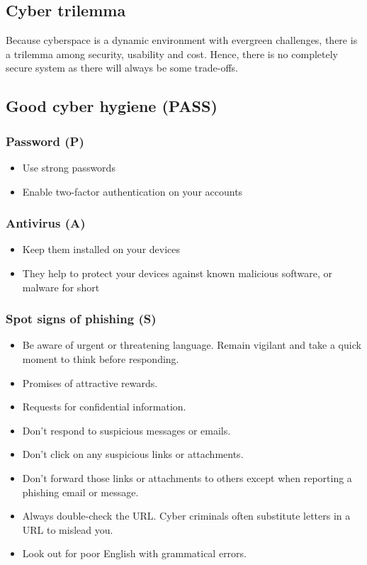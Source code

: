 \documentclass[11pt]{article}
\begin{document}
\subsection{Cyber trilemma}
\label{sec:org4428675}
Because cyberspace is a dynamic environment with evergreen challenges, there is a trilemma among security, usability and cost. Hence, there is no completely secure system as there will always be some trade-offs.

\subsection{Good cyber hygiene (PASS)}
\label{sec:orgb5034a4}

\subsubsection{Password (P)}
\label{sec:org2089b7f}
\begin{itemize}
\item Use strong passwords
\item Enable two-factor authentication on your accounts
\end{itemize}

\subsubsection{Antivirus (A)}
\label{sec:org780fb2b}
\begin{itemize}
\item Keep them installed on your devices
\item They help to protect your devices against known malicious software, or malware for short
\end{itemize}

\subsubsection{Spot signs of phishing (S)}
\label{sec:org16e22fd}
\begin{itemize}
\item Be aware of urgent or threatening language. Remain vigilant and take a quick moment to think before responding.
\item Promises of attractive rewards.
\item Requests for confidential information.
\item Don't respond to suspicious messages or emails.
\item Don't click on any suspicious links or attachments.
\item Don't forward those links or attachments to others except when reporting a phishing email or message.
\item Always double-check the URL. Cyber criminals often substitute letters in a URL to mislead you.
\item Look out for poor English with grammatical errors.
\end{itemize}
\end{document}
